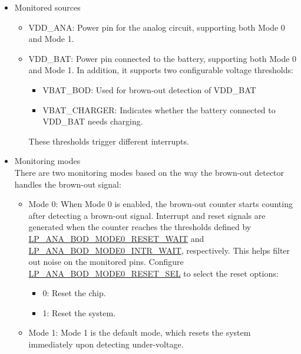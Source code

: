 \documentclass[main\_\_EN.tex]{subfiles}
\begin{document}
\begin{itemize}
    \item Monitored sources
    \begin{itemize}
        \item VDD\_ANA: Power pin for the analog circuit, supporting both Mode 0 and Mode 1.
        \item VDD\_BAT: Power pin connected to the battery, supporting both Mode 0 and Mode 1. In addition, it supports two configurable voltage thresholds:
        \begin{itemize}
        \item VBAT\_BOD: Used for brown-out detection of VDD\_BAT
        \item VBAT\_CHARGER: Indicates whether the battery connected to VDD\_BAT needs charging.
        \end{itemize}
         These thresholds trigger different interrupts.
    \end{itemize}

    \item Monitoring modes \\
    There are two monitoring modes based on the way the brown-out detector handles the brown-out signal:
    \begin{itemize}
        \item Mode 0: When Mode 0 is enabled, the brown-out counter starts counting after detecting a brown-out signal. Interrupt and reset signals are generated when the counter reaches the thresholds defined by \hyperref[fielddesc:LPANABODMODE0RESETWAIT]{LP\_ANA\_BOD\_MODE0\_RESET\_WAIT} and \hyperref[fielddesc:LPANABODMODE0INTRWAIT]{LP\_ANA\_BOD\_MODE0\_INTR\_WAIT}, respectively. This helps filter out noise on the monitored pins. Configure \hyperref[fielddesc:LPANABODMODE0RESETSEL]{LP\_ANA\_BOD\_MODE0\_RESET\_SEL} to select the reset options:
        \begin{itemize}
            \item 0: Reset the chip.
            \item 1: Reset the system.
        \end{itemize}
        \item Mode 1: Mode 1 is the default mode, which resets the system immediately upon detecting under-voltage.
    \end{itemize}


\end{itemize}
\end{document}
